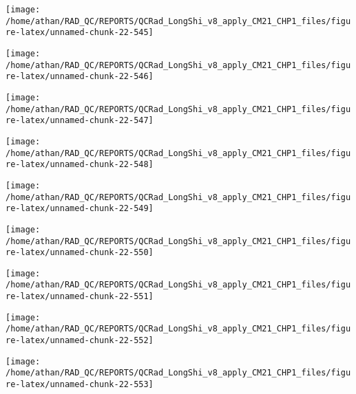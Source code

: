 \documentclass[
  10pt,
  a4paper,oneside]{article}
\begin{document}
\begin{center}\texttt{[image: /home/athan/RAD\_QC/REPORTS/QCRad\_LongShi\_v8\_apply\_CM21\_CHP1\_files/figure-latex/unnamed-chunk-22-545]} \end{center}

\begin{center}\texttt{[image: /home/athan/RAD\_QC/REPORTS/QCRad\_LongShi\_v8\_apply\_CM21\_CHP1\_files/figure-latex/unnamed-chunk-22-546]} \end{center}

\begin{center}\texttt{[image: /home/athan/RAD\_QC/REPORTS/QCRad\_LongShi\_v8\_apply\_CM21\_CHP1\_files/figure-latex/unnamed-chunk-22-547]} \end{center}

\begin{center}\texttt{[image: /home/athan/RAD\_QC/REPORTS/QCRad\_LongShi\_v8\_apply\_CM21\_CHP1\_files/figure-latex/unnamed-chunk-22-548]} \end{center}

\begin{center}\texttt{[image: /home/athan/RAD\_QC/REPORTS/QCRad\_LongShi\_v8\_apply\_CM21\_CHP1\_files/figure-latex/unnamed-chunk-22-549]} \end{center}

\begin{center}\texttt{[image: /home/athan/RAD\_QC/REPORTS/QCRad\_LongShi\_v8\_apply\_CM21\_CHP1\_files/figure-latex/unnamed-chunk-22-550]} \end{center}

\begin{center}\texttt{[image: /home/athan/RAD\_QC/REPORTS/QCRad\_LongShi\_v8\_apply\_CM21\_CHP1\_files/figure-latex/unnamed-chunk-22-551]} \end{center}

\begin{center}\texttt{[image: /home/athan/RAD\_QC/REPORTS/QCRad\_LongShi\_v8\_apply\_CM21\_CHP1\_files/figure-latex/unnamed-chunk-22-552]} \end{center}

\begin{center}\texttt{[image: /home/athan/RAD\_QC/REPORTS/QCRad\_LongShi\_v8\_apply\_CM21\_CHP1\_files/figure-latex/unnamed-chunk-22-553]} \end{center}
\end{document}
